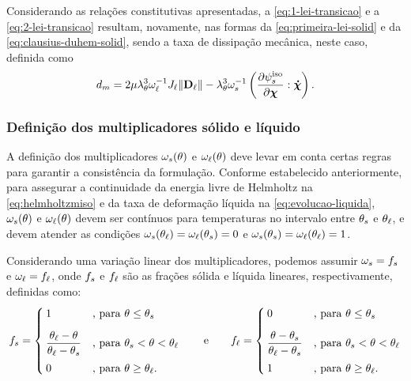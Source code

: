 \documentclass[Tese.tex]{subfiles}
\begin{document}
Considerando as relações constitutivas apresentadas, a \cref{eq:1-lei-transicao} e a \cref{eq:2-lei-transicao} resultam, novamente, nas formas da \cref{eq:primeira-lei-solid} e da \cref{eq:clausius-duhem-solid}, sendo a taxa de dissipação mecânica, neste caso, definida como
\begin{equation} \label{eq:dissipation-mushy}
d_{m} = 2\mu\lambda_{\theta}^3\omega_\ell^{-1}J_\ell\|\mathbf{D}_\ell\| - \lambda_{\theta}^3\omega_s^{-1}\left(\dfrac{\partial\psi_s^\text{iso}}{\partial\boldsymbol{\chi}}:\boldsymbol{\dot{\chi}}\right).
\end{equation}

\subsubsection{Definição dos multiplicadores sólido e líquido}

A definição dos multiplicadores $\omega_s(\theta)$ e $\omega_\ell(\theta)$ deve levar em conta certas regras para garantir a consistência da formulação. Conforme estabelecido anteriormente, para assegurar a continuidade da energia livre de Helmholtz na \cref{eq:helmholtzmiso} e da taxa de deformação líquida na \cref{eq:evolucao-liquida}, $\omega_s(\theta)$ e $\omega_\ell(\theta)$ devem ser contínuos para temperaturas no intervalo entre $\theta_s$ e $\theta_\ell$, e devem atender as condições $\omega_s(\theta_\ell) = \omega_\ell(\theta_s) = 0$ e $\omega_s(\theta_s) = \omega_\ell(\theta_\ell) = 1$.

Considerando uma variação linear dos multiplicadores, podemos assumir $\omega_s=f_s$ e $\omega_\ell = f_\ell$, onde $f_s$ e $f_\ell$ são as frações sólida e líquida lineares, respectivamente, definidas como:
\begin{equation}\label{eq:fs-fl}
f_s =
\begin{cases}
1 			&\text{, para }\theta \leq \theta_s\\[0.3cm]
\dfrac{\theta_\ell - \theta}{\theta_\ell-\theta_s} &\text{, para }\theta_s < \theta < \theta_\ell \\[0.3cm]
0			&\text{, para }\theta \geq \theta_\ell.
\end{cases}
\text{\qquad e\qquad}
f_\ell =
\begin{cases}
0 			&\text{, para }\theta \leq \theta_s\\[0.3cm]
\dfrac{\theta - \theta_s}{\theta_\ell-\theta_s} &\text{, para }\theta_s < \theta < \theta_\ell \\[0.3cm]
1			&\text{, para }\theta \geq \theta_\ell.
\end{cases}
\end{equation}
\end{document}
